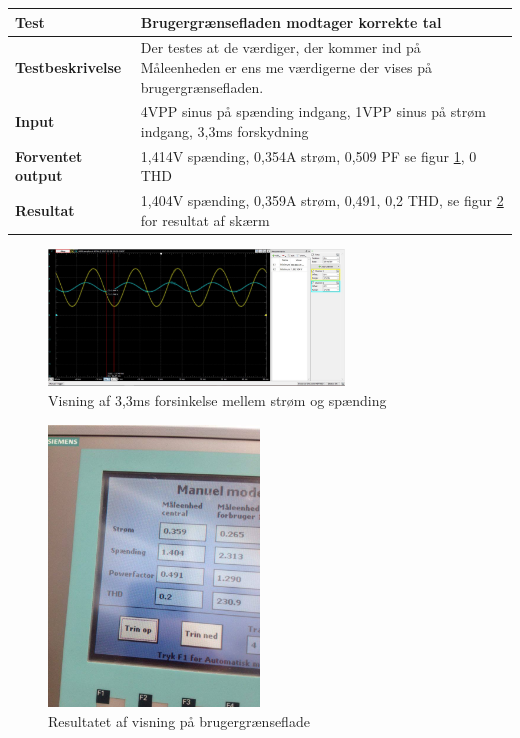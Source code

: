 \begin{center}
	\begin{tabular}{ | m{} | m{}|} 
		\hline
		\textbf{Test}					&Brugergrænsefladen modtager korrekte tal \\ \hline
		\textbf{Testbeskrivelse}		&Der testes at de værdiger, der kommer ind på Måleenheden er ens me værdigerne der vises på brugergrænsefladen. \\ \hline
		\textbf{Input}					&4VPP sinus på spænding indgang, 1VPP sinus på strøm indgang, 3,3ms forskydning \\ \hline
		\textbf{Forventet output}		&1,414V spænding, 0,354A strøm, 0,509 PF se figur \ref{fig:PFtest1}, 0 THD \\ \hline
		\textbf{Resultat}				&1,404V spænding, 0,359A strøm, 0,491, 0,2 THD,  se figur \ref*{fig:visningtest1} for resultat af skærm  \\ \hline
	\end{tabular}
\end{center}

\begin{figure}[H] %
	\centering
	\includegraphics[width=0.7\textwidth]{Test/PFTest1}
	\caption{Visning af 3,3ms forsinkelse mellem strøm og spænding}
	\label{fig:PFtest1}
\end{figure}

\begin{figure}[H] %
	\centering
	\includegraphics[width=0.5\textwidth]{Test/Visningstest1}
	\caption{Resultatet af visning på brugergrænseflade}
	\label{fig:visningtest1}
\end{figure}


